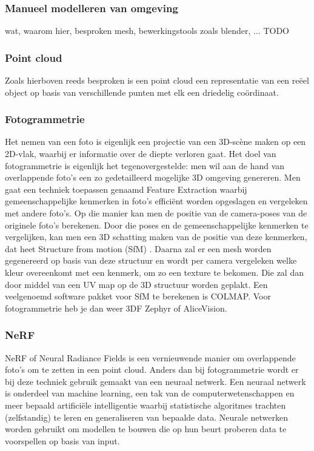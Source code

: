 \subsubsection{Manueel modelleren van omgeving}
wat, waarom hier, besproken mesh, bewerkingstools zoals blender, ... TODO

\subsubsection{Point cloud }
Zoals hierboven reeds besproken is een point cloud een representatie van een reëel object op basis van verschillende punten met elk een driedelig coördinaat. 


\subsubsection{Fotogrammetrie}

Het nemen van een foto is eigenlijk een projectie van een 3D-scène maken op een 2D-vlak, waarbij er informatie over de diepte verloren gaat. Het doel van fotogrammetrie is eigenlijk het tegenovergestelde: men wil aan de hand van overlappende foto’s een zo gedetailleerd mogelijke 3D omgeving genereren. \autocite{FormLabs}
Men gaat een techniek toepassen genaamd Feature Extraction waarbij gemeenschappelijke kenmerken in foto’s efficiënt worden opgeslagen en vergeleken met andere foto’s. Op die manier kan men de positie van de camera-poses van de originele foto’s berekenen. Door die poses en de gemeenschappelijke kenmerken te vergelijken, kan men een 3D schatting maken van de positie van deze kenmerken, dat heet Structure from motion (SfM) \autocite{Schonberger2016}. Daarna zal er een mesh worden gegenereerd op basis van deze structuur en wordt per camera vergeleken welke kleur overeenkomt met een kenmerk, om zo een texture te bekomen. Die zal dan door middel van een UV map op de 3D structuur worden geplakt. Een veelgenoemd software pakket voor SfM te berekenen is COLMAP. Voor fotogrammetrie heb je dan weer 3DF Zephyr of AliceVision. 

\subsubsection{NeRF}

NeRF of Neural Radiance Fields is een vernieuwende manier om overlappende foto’s om te zetten in een point cloud. Anders dan bij fotogrammetrie wordt er bij deze techniek gebruik gemaakt van een neuraal netwerk.
Een neuraal netwerk is onderdeel van machine learning, een tak van de computerwetenschappen en meer bepaald artificiële intelligentie waarbij statistische algoritmes trachten (zelfstandig)  te leren en generaliseren van bepaalde data. Neurale netwerken worden gebruikt om modellen te bouwen die op hun beurt proberen data te voorspellen op basis van input. 

